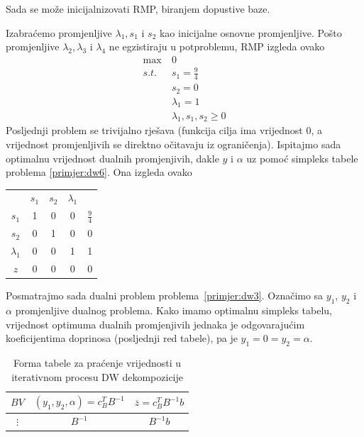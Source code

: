 \documentclass[a4paper, utf8, 11pt, colorlinks]{book}
\begin{document}
Sada se može inicijalnizovati RMP, biranjem dopustive baze.

Izabraćemo promjenljive $\lambda_1, s_1$ i $s_2$ kao inicijalne osnovne promjenljive. Pošto  promjenljive $\lambda_2,\lambda_3$ i $\lambda_4$ ne egzistiraju u potproblemu,  RMP izgleda ovako
      \begin{equation}
	\begin{aligned}\label{primjer:dw6}
		\max\  & 0\\
		s.t.\  &s_1=\frac 94\\
		&s_2=0\\
		&\lambda_1 = 1\\
		&\lambda_1,s_1,s_2\geqslant 0
	\end{aligned}
\end{equation}
Posljednji problem se trivijalno rješava (funkcija cilja ima vrijednost 0, a vrijednost promjenljivih se direktno očitavaju iz ograničenja). Ispitajmo sada optimalnu vrijednost dualnih promjenjivih, dakle $y$ i $\alpha$ uz pomoć simpleks tabele problema \ref{primjer:dw6}. Ona izgleda ovako
\begin{center}

\begin{tabular}{c|cccc}
	       &$s_1$  & $ s_2$   & $\lambda_1$ &  \\
 $s_1$	   &  1  &   0      &   0         &  $\frac{9}{4}$ \\
  $s_2$	  &  0  &    1     &   0         &  0             \\
$\lambda_1$	  &  0  &    0     &   1         &  1   \\ \hline
	$z$   & 0  &    0     &   0         &  0
\end{tabular}
\end{center}
 
Posmatrajmo sada dualni problem problema~\ref{primjer:dw3}. Označimo sa $y_1$, $y_2$ i $\alpha$ promjenljive dualnog problema. Kako imamo optimalnu simpleks tabelu, vrijednost optimuma dualnih promjenjivih jednaka je odgovarajućim koeficijentima doprinosa (posljednji red tabele), pa je $y_1 = 0 = y_2 = \alpha$. 

\begin{table}\centering
	\begin{tabular}{|c|c|c|}
		\hline
	$BV$ &	$(y_1,y_2,\alpha)=c^T_B B^{-1}$ & $\overline{z}= c^T_B B^{-1}b$ \\
		\hline
	$\vdots$ & 	$B^{-1}$& $B^{-1}b$ \\
		\hline
	\end{tabular}\caption{Forma tabele za praćenje vrijednosti u iterativnom procesu DW dekompozicije}\label{tbl:dw1}
\end{table}
\end{document}

